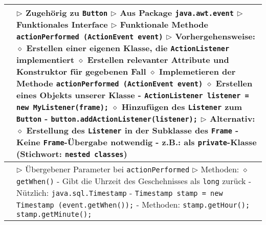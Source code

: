 \begin{longtable}{ | p{} p{} | }
	\makecell[l]{Interface ActionListener} & \makecell[l]{
	$\rhd$ Zugehörig zu \texttt{Button} \\
	$\rhd$ Aus Package \texttt{java.awt.event} \\
	$\rhd$ Funktionales Interface \\
	$\rhd$ Funktionale Methode \texttt{actionPerformed (ActionEvent event)} \\
	$\rhd$ Vorhergehensweise: \\
	\hspace{0.4cm} $\diamond$ Erstellen einer eigenen Klasse, die \texttt{ActionListener} implementiert \\
	\hspace{0.4cm} $\diamond$ Erstellen relevanter Attribute und Konstruktor für gegebenen Fall \\
	\hspace{0.4cm} $\diamond$ Implemetieren der Methode \texttt{actionPerformed (ActionEvent event)} \\
	\hspace{0.4cm} $\diamond$ Erstellen eines Objekts unserer Klasse \\ 
	\hspace{0.6cm} - \texttt{ActionListener listener = new MyListener(frame);} \\
	\hspace{0.4cm} $\diamond$ Hinzufügen des \texttt{Listener} zum \texttt{Button} \\
	\hspace{0.6cm} - \texttt{button.addActionListener(listener);} \\
	$\rhd$ Alternativ: \\
	\hspace{0.4cm} $\diamond$ Erstellung des \texttt{Listener} in der Subklasse des \texttt{Frame} \\ 
	\hspace{0.6cm} - Keine \texttt{Frame}-Übergabe notwendig \\
	\hspace{0.6cm} - z.B.: als \texttt{private}-Klasse (Stichwort: \texttt{nested classes}) \\
	 } \\ \hline

	\makecell[l]{Klasse ActionEvent} & \makecell[l]{
	$\rhd$ Übergebener Parameter bei \texttt{actionPerformed} \\
	$\rhd$ Methoden: \\
	\hspace{0.4cm} $\diamond$ \texttt{getWhen()} \\
	\hspace{0.6cm} - Gibt die Uhrzeit des Geschehnisses als \texttt{long} zurück \\
	\hspace{0.6cm} - Nützlich: \texttt{java.sql.Timestamp} \\
	\hspace{0.6cm} - \texttt{Timestamp stamp = new Timestamp (event.getWhen());} \\ 
	\hspace{0.6cm} - Methoden: \texttt{stamp.getHour(); stamp.getMinute();}} \\ \hline


\end{longtable}
